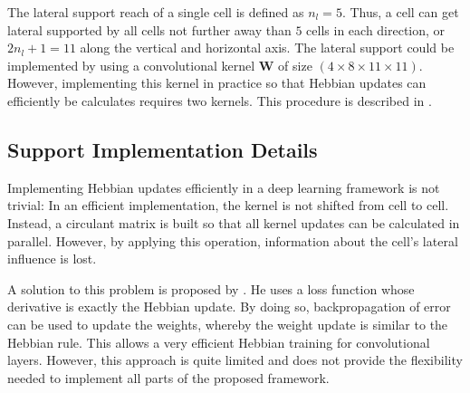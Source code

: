 The lateral support reach of a single cell is defined as $n_l=5$. Thus, a cell can get lateral supported by all cells not further away than $5$ cells in each direction, or $2n_l+1=11$ along the vertical and horizontal axis.
The lateral support could be implemented by using a convolutional kernel $\boldsymbol{W}$ of size $(4 \times 8 \times 11 \times 11)$. However, implementing this kernel in practice so that Hebbian updates can efficiently be calculates requires two kernels. This procedure is described in .



















\subsection{Support Implementation Details}
Implementing Hebbian updates efficiently in a deep learning framework is not trivial: In an efficient implementation, the kernel is not shifted from cell to cell. Instead, a circulant matrix is built so that all kernel updates can be calculated in parallel. However, by applying this operation, information about the cell's lateral influence is lost.

A solution to this problem is proposed by . He uses a loss function whose derivative is exactly the Hebbian update. By doing so, backpropagation of error can be used to update the weights, whereby the weight update is similar to the Hebbian rule.
This allows a very efficient Hebbian training for convolutional layers.
However, this approach is quite limited and does not provide the flexibility needed to implement all parts of the proposed framework.

